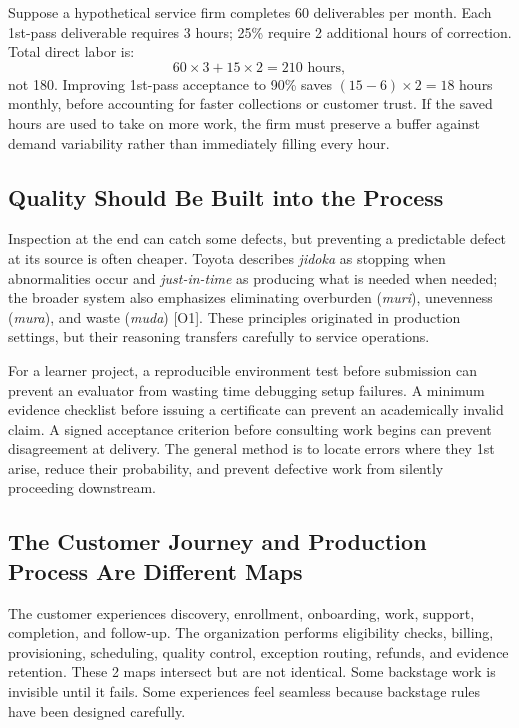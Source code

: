 Suppose a hypothetical service firm completes 60 deliverables per month. Each 1st-pass deliverable requires 3 hours; 25\% require 2 additional hours of correction. Total direct labor is:
\begin{equation}
60 \times 3 + 15 \times 2 = 210\text{ hours},
\end{equation}
not 180. Improving 1st-pass acceptance to 90\% saves $(15 - 6) \times 2 = 18$ hours monthly, before accounting for faster collections or customer trust. If the saved hours are used to take on more work, the firm must preserve a buffer against demand variability rather than immediately filling every hour.

\subsection{Quality Should Be Built into the Process}
\label{sec:quality_built_in}

Inspection at the end can catch some defects, but preventing a predictable defect at its source is often cheaper. Toyota describes \textit{jidoka} as stopping when abnormalities occur and \textit{just-in-time} as producing what is needed when needed; the broader system also emphasizes eliminating overburden (\textit{muri}), unevenness (\textit{mura}), and waste (\textit{muda}) [O1]. These principles originated in production settings, but their reasoning transfers carefully to service operations.

For a learner project, a reproducible environment test before submission can prevent an evaluator from wasting time debugging setup failures. A minimum evidence checklist before issuing a certificate can prevent an academically invalid claim. A signed acceptance criterion before consulting work begins can prevent disagreement at delivery. The general method is to locate errors where they 1st arise, reduce their probability, and prevent defective work from silently proceeding downstream.

\subsection{The Customer Journey and Production Process Are Different Maps}
\label{sec:customer_journey_vs_production}

The customer experiences discovery, enrollment, onboarding, work, support, completion, and follow-up. The organization performs eligibility checks, billing, provisioning, scheduling, quality control, exception routing, refunds, and evidence retention. These 2 maps intersect but are not identical. Some backstage work is invisible until it fails. Some experiences feel seamless because backstage rules have been designed carefully.

